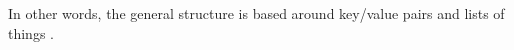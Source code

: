 In other words, the general structure is based around key/value pairs and lists of things \parencite{Anderson.2010.Buch}.






%
